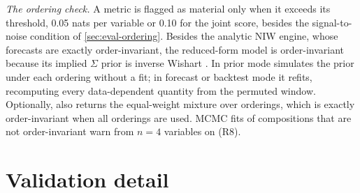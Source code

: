 \emph{The ordering check.}
A metric is flagged as material only when it exceeds its threshold, 0.05 nats per variable or 0.10
for the joint score, besides the signal-to-noise condition of \cref{sec:eval-ordering}.
Besides the analytic NIW engine, whose forecasts are exactly order-invariant, the reduced-form
 model is order-invariant because its implied $\Sigma$ prior is
inverse Wishart \citep{chan2022asymmetric}.
In prior mode  simulates the prior under each ordering without a
fit; in forecast or backtest mode it refits, recomputing every data-dependent quantity from the
permuted window.
Optionally,  also returns the equal-weight mixture over
orderings, which is exactly order-invariant when all orderings are used.
MCMC fits of compositions that are not order-invariant warn from $n = 4$ variables on (R8).

\clearpage

\section{Validation detail}\label{app:validation}

